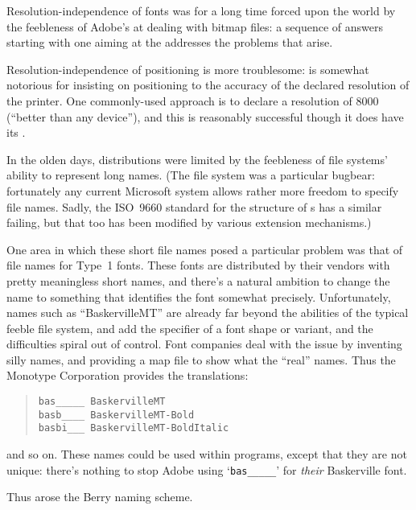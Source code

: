 Resolution-independence of fonts was for a  long time forced upon the
world by the feebleness of Adobe's 
 at dealing with bitmap files: a sequence of answers
starting with one aiming at the %
 addresses
the problems that arise.

Resolution-independence of positioning is more troublesome:
 is somewhat notorious for insisting on positioning to
the accuracy of the declared resolution of the printer.
One commonly-used approach is to declare a resolution of 8000 (``better
than any device''), and this is reasonably successful though it does
have its .


In the olden days, \AllTeX{} distributions were limited by the
feebleness of file systems' ability to represent long names.  (The
\MSDOS{} file system was a particular bugbear: fortunately any current
Microsoft system allows rather more freedom to specify file names.
Sadly, the ISO~9660 standard for the structure of \CDROM{}s has a
similar failing, but that too has been modified by various extension
mechanisms.)

One area in which these short file names posed a particular problem
was that of file names for Type~1 fonts.
These fonts are distributed by their vendors with
pretty meaningless short names, and there's a natural ambition to
change the name to something that identifies the font somewhat
precisely.  Unfortunately, names such as ``BaskervilleMT'' are
already far beyond the abilities of the typical feeble file system,
and add the specifier of a font shape or variant, and the difficulties
spiral out of control.  Font companies deal with the issue by
inventing silly names, and providing a map file to show what the
``real'' names.  Thus the Monotype Corporation provides the
translations:
\begin{quote}
  \texttt{bas\_\_\_\_\_ BaskervilleMT}\\
  \texttt{basb\_\_\_\_ BaskervilleMT-Bold}\\
  \texttt{basbi\_\_\_ BaskervilleMT-BoldItalic}
\end{quote}
and so on.  These names could be used within \AllTeX{} programs,
except that they are not unique: there's nothing to stop Adobe using
`\texttt{bas\_\_\_\_\_}' for \emph{their} Baskerville font.

Thus arose the Berry naming scheme.

